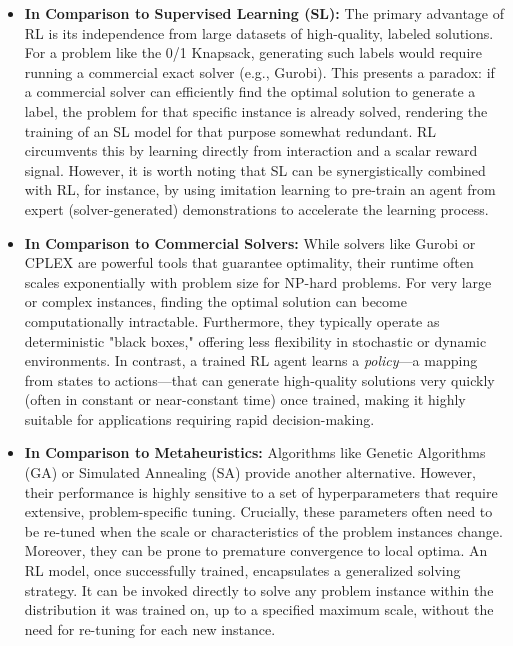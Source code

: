 \begin{itemize}
    \item \textbf{In Comparison to Supervised Learning (SL):} The primary advantage of RL is its independence from large datasets of high-quality, labeled solutions. For a problem like the 0/1 Knapsack, generating such labels would require running a commercial exact solver (e.g., Gurobi). This presents a paradox: if a commercial solver can efficiently find the optimal solution to generate a label, the problem for that specific instance is already solved, rendering the training of an SL model for that purpose somewhat redundant. RL circumvents this by learning directly from interaction and a scalar reward signal. However, it is worth noting that SL can be synergistically combined with RL, for instance, by using imitation learning to pre-train an agent from expert (solver-generated) demonstrations to accelerate the learning process.

    \item \textbf{In Comparison to Commercial Solvers:} While solvers like Gurobi or CPLEX are powerful tools that guarantee optimality, their runtime often scales exponentially with problem size for NP-hard problems. For very large or complex instances, finding the optimal solution can become computationally intractable. Furthermore, they typically operate as deterministic "black boxes," offering less flexibility in stochastic or dynamic environments. In contrast, a trained RL agent learns a \textit{policy}---a mapping from states to actions---that can generate high-quality solutions very quickly (often in constant or near-constant time) once trained, making it highly suitable for applications requiring rapid decision-making.

    \item \textbf{In Comparison to Metaheuristics:} Algorithms like Genetic Algorithms (GA) or Simulated Annealing (SA) provide another alternative. However, their performance is highly sensitive to a set of hyperparameters that require extensive, problem-specific tuning. Crucially, these parameters often need to be re-tuned when the scale or characteristics of the problem instances change. Moreover, they can be prone to premature convergence to local optima. An RL model, once successfully trained, encapsulates a generalized solving strategy. It can be invoked directly to solve any problem instance within the distribution it was trained on, up to a specified maximum scale, without the need for re-tuning for each new instance.
\end{itemize}


